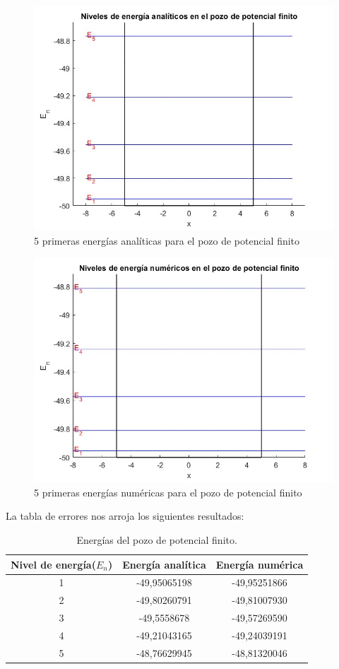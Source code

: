 \documentclass[12pt]{article}
\begin{document}
\begin{figure}[H]
    \centering
    \includegraphics[width=1.0\textwidth]{energias_finito_analit.jpg}
    \caption{5 primeras energías analíticas para el pozo de potencial finito}
\end{figure} 
\begin{figure}[H]
    \centering
    \includegraphics[width=1.0\textwidth]{energias_finito_numerico.jpg}
    \caption{5 primeras energías numéricas para el pozo de potencial finito}
\end{figure} 
La tabla de errores nos arroja los siguientes resultados:
\begin{table}[H]
    \centering
    \begin{tabular}{|c|c|c||}
    \hline
    Nivel de energía($E_n$) & Energía analítica & Energía numérica \\
    \hline  
    1 & -49,95065198 & -49,95251866  \\
    \hline
    2 & -49,80260791 & -49,81007930  \\
    \hline
    3 & -49,5558678 & -49,57269590   \\
    \hline
    4 & -49,21043165 & -49,24039191  \\
    \hline
    5 & -48,76629945 & -48,81320046  \\
    \hline
    \end{tabular}
    \caption{Energías del pozo de potencial finito.}
 \end{table}
\end{document}
